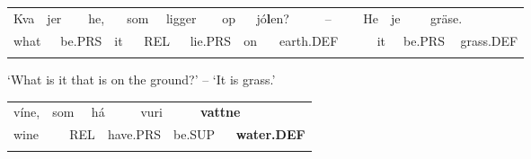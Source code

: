 \begin{tabular}{llllllllllllllllllllll}
\lsptoprule
Kva & \multicolumn{2}{l}{jer

} & \multicolumn{2}{l}{he,

} & \multicolumn{2}{l}{som

} & \multicolumn{2}{l}{ligger

} & \multicolumn{2}{l}{op

} & \multicolumn{2}{l}{jó\textbf{l}en?

} & \multicolumn{2}{l}{–

} & \multicolumn{2}{l}{He

} & \multicolumn{2}{l}{je

} & \multicolumn{2}{l}{gräse.

} & \\
\multicolumn{2}{l}{what

} & \multicolumn{2}{l}{be.PRS

} & \multicolumn{2}{l}{it

} & \multicolumn{2}{l}{REL

} & \multicolumn{2}{l}{lie.PRS

} & \multicolumn{2}{l}{on

} & \multicolumn{2}{l}{earth.DEF

} & \multicolumn{2}{l}{} & \multicolumn{2}{l}{it

} & \multicolumn{2}{l}{be.PRS

} & \multicolumn{2}{l}{grass.DEF

}\\
\lspbottomrule
\end{tabular}

\begin{styleTranslation}
‘What is it that is on the ground?’ – ‘It is grass.’

\end{styleTranslation}

\begin{tabular}{llllllllll}
\lsptoprule
víne, & \multicolumn{2}{l}{som

} & \multicolumn{2}{l}{há

} & \multicolumn{2}{l}{vuri

} & \multicolumn{2}{l}{{\bfseries vattne}

} & \\
\multicolumn{2}{l}{wine

} & \multicolumn{2}{l}{REL

} & \multicolumn{2}{l}{have.PRS

} & \multicolumn{2}{l}{be.SUP

} & \multicolumn{2}{l}{{\bfseries water.DEF}

}\\
\lspbottomrule
\end{tabular}

